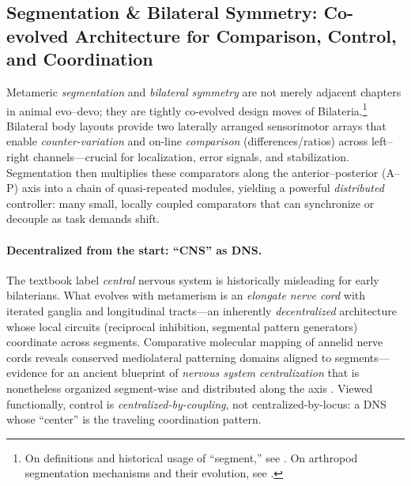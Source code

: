 \subsection{Segmentation \& Bilateral Symmetry: Co-evolved Architecture for Comparison, Control, and Coordination}
\label{subsec:segm_bilateral}

Metameric \emph{segmentation} and \emph{bilateral symmetry} are not merely adjacent chapters in animal evo–devo; they are tightly co-evolved design moves of Bilateria.\footnote{On definitions and historical usage of “segment,” see \citep{HannibalPatel2013WhatIsASegment}. On arthropod segmentation mechanisms and their evolution, see \citep{ChipmanArias2019ArthropodSegmentation}.} 
Bilateral body layouts provide two laterally arranged sensorimotor arrays that enable \emph{counter-variation} and on-line \emph{comparison} (differences/ratios) across left–right channels—crucial for localization, error signals, and stabilization. Segmentation then multiplies these comparators along the anterior–posterior (A–P) axis into a chain of quasi-repeated modules, yielding a powerful \emph{distributed} controller: many small, locally coupled comparators that can synchronize or decouple as task demands shift.

\paragraph{Decentralized from the start: “CNS” as DNS.}
The textbook label \emph{central} nervous system is historically misleading for early bilaterians. What evolves with metamerism is an \emph{elongate nerve cord} with iterated ganglia and longitudinal tracts—an inherently \emph{decentralized} architecture whose local circuits (reciprocal inhibition, segmental pattern generators) coordinate across segments. 
Comparative molecular mapping of annelid nerve cords reveals conserved mediolateral patterning domains aligned to segments—evidence for an ancient blueprint of \emph{nervous system centralization} that is nonetheless organized segment-wise and distributed along the axis \citep{DenesEtAl2007CellAnnelidCord,Telford2007SingleOriginCNS}. 
Viewed functionally, control is \emph{centralized-by-coupling}, not centralized-by-locus: a DNS whose “center” is the traveling coordination pattern.

